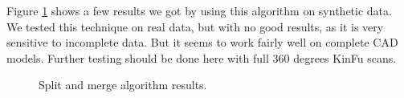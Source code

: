 \documentclass{article}
\begin{document}
Figure \ref{fig:split_merge} shows a few results we got by using this algorithm on synthetic data. We tested this technique on real data, but with no good results, as it is very sensitive to incomplete data. But it seems to work fairly well on complete CAD models. Further testing should be done here with full 360 degrees KinFu scans.

\begin{figure}
\centering
{}


\caption {Split and merge algorithm results.}
\label{fig:split_merge}
\end{figure}
\end{document}
